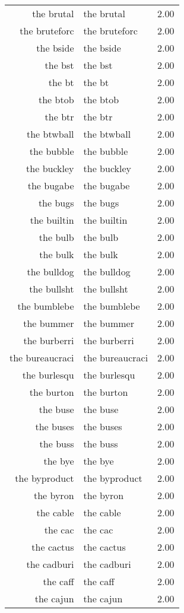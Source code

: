 \begin{table}[ht]
\begin{tabular}{rlr}
  the brutal & the brutal & 2.00 \\ 
  the bruteforc & the bruteforc & 2.00 \\ 
  the bside & the bside & 2.00 \\ 
  the bst & the bst & 2.00 \\ 
  the bt & the bt & 2.00 \\ 
  the btob & the btob & 2.00 \\ 
  the btr & the btr & 2.00 \\ 
  the btwball & the btwball & 2.00 \\ 
  the bubble & the bubble & 2.00 \\ 
  the buckley & the buckley & 2.00 \\ 
  the bugabe & the bugabe & 2.00 \\ 
  the bugs & the bugs & 2.00 \\ 
  the builtin & the builtin & 2.00 \\ 
  the bulb & the bulb & 2.00 \\ 
  the bulk & the bulk & 2.00 \\ 
  the bulldog & the bulldog & 2.00 \\ 
  the bullsht & the bullsht & 2.00 \\ 
  the bumblebe & the bumblebe & 2.00 \\ 
  the bummer & the bummer & 2.00 \\ 
  the burberri & the burberri & 2.00 \\ 
  the bureaucraci & the bureaucraci & 2.00 \\ 
  the burlesqu & the burlesqu & 2.00 \\ 
  the burton & the burton & 2.00 \\ 
  the buse & the buse & 2.00 \\ 
  the buses & the buses & 2.00 \\ 
  the buss & the buss & 2.00 \\ 
  the bye & the bye & 2.00 \\ 
  the byproduct & the byproduct & 2.00 \\ 
  the byron & the byron & 2.00 \\ 
  the cable & the cable & 2.00 \\ 
  the cac & the cac & 2.00 \\ 
  the cactus & the cactus & 2.00 \\ 
  the cadburi & the cadburi & 2.00 \\ 
  the caff & the caff & 2.00 \\ 
  the cajun & the cajun & 2.00 \\ 

\end{tabular}
\end{table}
